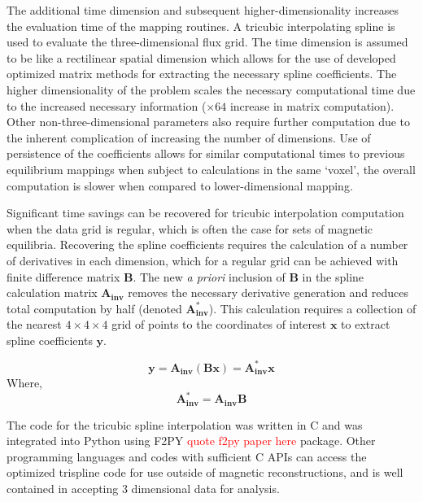 \documentclass[12pt,floatfix,showpacs]{revtex4-1}
\newcommand{\note}[1]{\textcolor{red}{#1}}
\begin{document}
The additional time dimension and subsequent higher-dimensionality increases the evaluation time of the mapping routines. 
A tricubic interpolating spline is used to evaluate the three-dimensional flux grid. 
The time dimension is assumed to be like a rectilinear spatial dimension which allows for the use of developed optimized matrix methods for extracting the necessary spline coefficients. 
The higher dimensionality of the problem scales the necessary computational time due to the increased necessary information ($\times64$ increase in matrix computation). 
Other non-three-dimensional parameters also require further computation due to the inherent complication of increasing the number of dimensions. 
Use of persistence of the coefficients allows for similar computational times to previous equilibrium mappings when subject to calculations in the same `voxel', the overall computation is slower when compared to lower-dimensional mapping.

Significant time savings can be recovered for tricubic interpolation computation when the data grid is regular, which is often the case for sets of magnetic equilibria. 
Recovering the spline coefficients requires the calculation of a number of derivatives in each dimension, which for a regular grid can be achieved with finite difference matrix $\boldsymbol{B}$. 
The new \emph{a priori} inclusion of $\boldsymbol{B}$ in the spline calculation matrix $\boldsymbol{A_{inv}}$ removes the necessary derivative generation and reduces total computation by half (denoted $\boldsymbol{A_{inv}^*}$). 
This calculation requires a collection of the nearest $4\times4\times4$ grid of points to the coordinates of interest $\boldsymbol{x}$ to extract spline coefficients $\boldsymbol{y}$.

\begin{equation}
\boldsymbol{y} = \boldsymbol{A_{inv}} ( \boldsymbol{B} \boldsymbol{x}) = \boldsymbol{A_{inv}^*}\boldsymbol{x}
\end{equation}
Where,
\begin{equation}
\boldsymbol{A_{inv}^*} = \boldsymbol{A_{inv}}\boldsymbol{B} 
\end{equation}

The code for the tricubic spline interpolation was written in C and was integrated into Python using F2PY \note{quote f2py paper here} package. 
Other programming languages and codes with sufficient C APIs can access the optimized trispline code for use outside of magnetic reconstructions, and is well contained in accepting 3 dimensional data for analysis.
\end{document}
